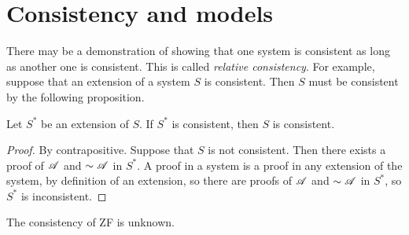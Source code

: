\section{Consistency and models}

There may be a demonstration of showing that one system is consistent as long as another one is consistent. This is called \textit{relative consistency}. For example, suppose that an extension of a system \(S\) is consistent. Then \(S\) must be consistent by the following proposition.

\setcounter{definition}{10}
\begin{proposition}
  Let \(S^*\) be an extension of \(S\). If \(S^*\) is consistent, then \(S\) is consistent.

  \begin{proof}
    By contrapositive. Suppose that \(S\) is not consistent. Then there exists a proof of \(\mathscr{A}\) and \(\sim\mathscr{A}\) in \(S^*\). A proof in a system is a proof in any extension of the system, by definition of an extension, so there are proofs of \(\mathscr{A}\) and \(\sim\mathscr{A}\) in \(S^*\), so \(S^*\) is inconsistent.
  \end{proof}
\end{proposition}

The consistency of ZF is unknown.

